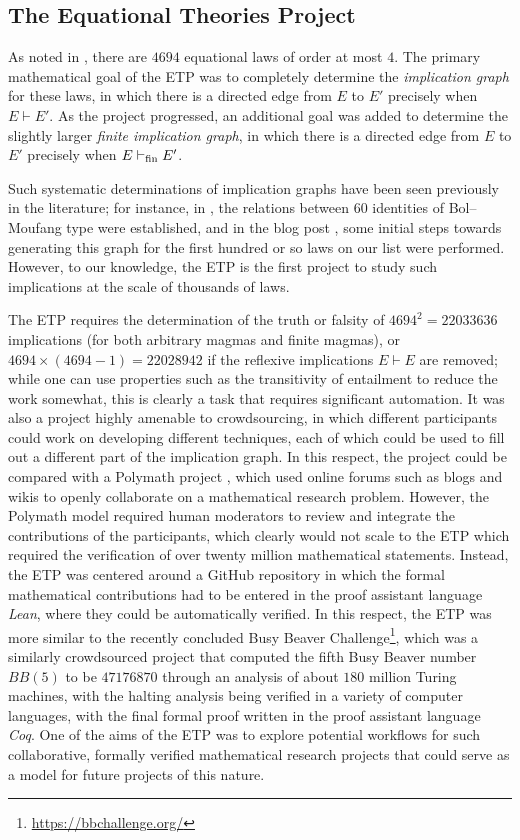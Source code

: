 \subsection{The Equational Theories Project}

As noted in , there are $\num{4694}$ equational laws of order at most $4$. The primary mathematical goal of the ETP was to completely determine the \emph{implication graph} for these laws, in which there is a directed edge from $E$ to $E'$ precisely when $E \vdash E'$. As the project progressed, an additional goal was added to determine the slightly larger \emph{finite implication graph}, in which there is a directed edge from $E$ to $E'$ precisely when $E \vdash_{\mathrm{fin}} E'$.

Such systematic determinations of implication graphs have been seen previously in the literature; for instance, in \cite{phillips-vojtechovsky}, the relations between $60$ identities of Bol--Moufang type were established, and in the blog post \cite[\S 17]{Wolfram_2022}, some initial steps towards generating this graph for the first hundred or so laws on our list were performed. However, to our knowledge, the ETP is the first project to study such implications at the scale of thousands of laws.

The ETP requires the determination of the truth or falsity of $\num{4694}^2 = \num{22033636}$ implications (for both arbitrary magmas and finite magmas), or $\num{4694} \times (\num{4694}-1) = \num{22028942}$ if the reflexive implications $E \vdash E$ are removed; while one can use properties such as the transitivity of entailment to reduce the work somewhat, this is clearly a task that requires significant automation. It was also a project highly amenable to crowdsourcing, in which different participants could work on developing different techniques, each of which could be used to fill out a different part of the implication graph. In this respect, the project could be compared with a Polymath project \cite{Gowers2009}, which used online forums such as blogs and wikis to openly collaborate on a mathematical research problem. However, the Polymath model required human moderators to review and integrate the contributions of the participants, which clearly would not scale to the ETP which required the verification of over twenty million mathematical statements. Instead, the ETP was centered around a GitHub repository in which the formal mathematical contributions had to be entered in the proof assistant language \emph{Lean}, where they could be automatically verified. In this respect, the ETP was more similar to the recently concluded Busy Beaver Challenge\footnote{\url{https://bbchallenge.org/}}, which was a similarly crowdsourced project that computed the fifth Busy Beaver number $BB(5)$ to be $\num{47176870}$ through an analysis of about $180$ million Turing machines, with the halting analysis being verified in a variety of computer languages, with the final formal proof written in the proof assistant language \emph{Coq}. One of the aims of the ETP was to explore potential workflows for such collaborative, formally verified mathematical research projects that could serve as a model for future projects of this nature.

